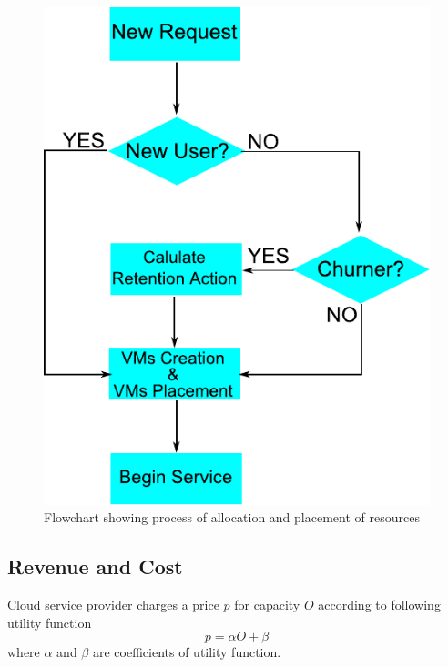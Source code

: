 
\begin{figure}[!h]
\centering
\includegraphics[scale=0.75]{pic/flowchart.pdf}
\caption{Flowchart showing process of allocation and placement of resources}
\label{flowchart}
\end{figure}




\subsection{Revenue and Cost}
 Cloud service provider charges a price $p$ for capacity $O$ according to following utility function  
\begin{equation}
 p= \alpha O+\beta
\label{eq:reveneue}
\end{equation}
where $\alpha$ and $\beta$ are coefficients of utility function.


